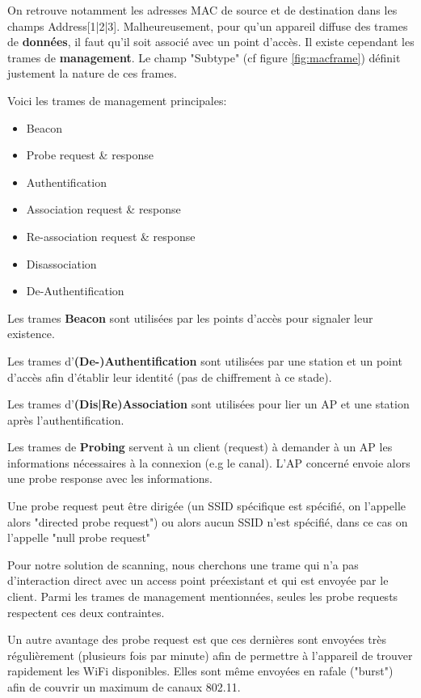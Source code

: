 On retrouve notamment les adresses MAC de source et de destination dans les champs Address[1|2|3].
Malheureusement, pour qu'un appareil diffuse des trames de \textbf{données}, il faut qu'il soit associé avec un point d'accès. 
Il existe cependant les trames de \textbf{management}. Le champ "Subtype" (cf figure \ref{fig:macframe}) définit justement
la nature de ces frames. 

Voici les trames de management principales:
\begin{itemize}
    \item Beacon
    \item Probe request \& response
    \item Authentification
    \item Association request \& response
    \item Re-association request \& response
    \item Disassociation
    \item De-Authentification
\end{itemize}

Les trames \textbf{Beacon} sont utilisées par les points d'accès pour signaler leur existence. 

Les trames d'\textbf{(De-)Authentification} sont utilisées par une station et un point d'accès afin d'établir leur identité (pas de chiffrement à ce stade).

Les trames d'\textbf{(Dis|Re)Association} sont utilisées pour lier un AP et une station après l'authentification.

Les trames de \textbf{Probing} servent à un client (request) à demander à un AP les informations nécessaires à la connexion (e.g le canal).
L'AP concerné envoie alors une probe response avec les informations. 

Une probe request peut être dirigée (un SSID spécifique est spécifié, on l'appelle alors "directed probe request") ou alors aucun SSID n'est spécifié, dans ce cas
on l'appelle "null probe request"

Pour notre solution de scanning, nous cherchons une trame qui n'a pas d'interaction direct avec un access point préexistant
et qui est envoyée par le client. Parmi les trames de management mentionnées, seules les probe requests respectent ces deux contraintes.

Un autre avantage des probe request est que ces dernières sont envoyées très régulièrement (plusieurs fois par minute)
afin de permettre à l'appareil de trouver rapidement les WiFi disponibles. Elles sont même envoyées en rafale ("burst") afin de couvrir
un maximum de canaux 802.11.

